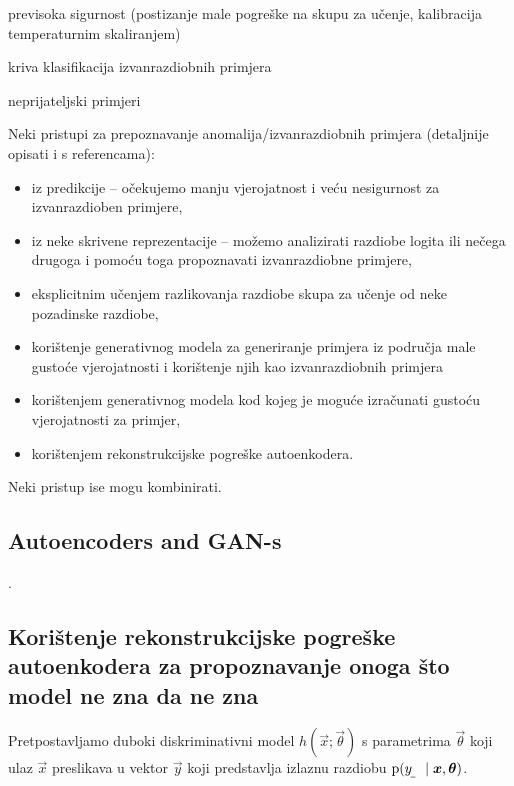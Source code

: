 \documentclass[twocolumn]{article}
\begin{document}
previsoka sigurnost (postizanje male pogreške na skupu za učenje, kalibracija temperaturnim skaliranjem)

kriva klasifikacija izvanrazdiobnih primjera

neprijateljski primjeri

\citep{Hendrycks:2016:BDMOODE}

\citep{Guo:2017:CMNN}

\citep{Lee:2017:TCCCDOOD}

\citep{Liang:2017:PDOODENN}

Neki pristupi za prepoznavanje anomalija/izvanrazdiobnih primjera (detaljnije opisati i s referencama):
\begin{itemize}
    \item iz predikcije -- očekujemo manju vjerojatnost i veću nesigurnost za izvanrazdioben primjere,
    \item iz neke skrivene reprezentacije -- možemo analizirati razdiobe logita ili nečega drugoga i pomoću toga propoznavati izvanrazdiobne primjere,
    \item eksplicitnim učenjem razlikovanja razdiobe skupa za učenje od neke pozadinske razdiobe,
    \item korištenje generativnog modela za generiranje primjera iz područja male gustoće vjerojatnosti i korištenje njih kao izvanrazdiobnih primjera
    \item korištenjem generativnog modela kod kojeg je moguće izračunati gustoću vjerojatnosti za primjer,
    \item korištenjem rekonstrukcijske pogreške autoenkodera.
\end{itemize}
Neki pristup ise mogu kombinirati.


\subsection{Autoencoders and GAN-s}

.


\subsection{Korištenje rekonstrukcijske pogreške autoenkodera za propoznavanje onoga što model ne zna da ne zna}

Pretpostavljamo duboki diskriminativni model $h(\vec x;\vec\theta)$ s parametrima $\vec\theta$ koji ulaz $\vec x$ preslikava u vektor $\vec y$ koji predstavlja izlaznu razdiobu  $\p(\rvar y\mid \vec x, \vec\theta)$.
\end{document}
